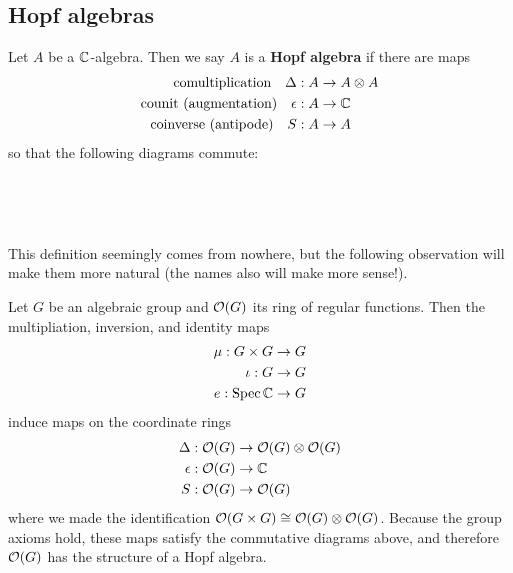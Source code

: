 \documentclass[12pt]{article}
\begin{document}
\subsection{Hopf algebras}
\begin{definition}
    Let $A$ be a $\mathbb{C}$-algebra. Then we say $A$ is a \textbf{Hopf algebra} if there are maps \begin{align*}
        \text{comultiplication\quad}\Delta: A &\to A\otimes A \\
        \text{counit (augmentation)\quad}\epsilon: A &\to \mathbb{C} \\
        \text{coinverse (antipode)\quad}S: A &\to A
    \end{align*}
    so that the following diagrams commute:
    \begin{center}
         \\

         \\
        

    \end{center}
\end{definition}
This definition seemingly comes from nowhere, but the following observation will make them more natural
(the names also will make more sense!).

\hfill

Let $G$ be an algebraic group and $\mathcal{O}(G)$ its ring of regular functions. Then the multipliation,
inversion, and identity maps \begin{align*}
    \mu: G\times G &\to G \\
    \iota: G &\to G \\
    e: \operatorname{Spec} \mathbb{C} &\to G
\end{align*}
induce maps on the coordinate rings
\begin{align*}
    \Delta: \mathcal{O}(G) &\to \mathcal{O}(G)\otimes \mathcal{O}(G) \\
    \epsilon: \mathcal{O}(G) &\to \mathbb{C} \\
    S: \mathcal{O}(G) &\to \mathcal{O}(G)
\end{align*} where we made the identification $\mathcal{O}(G\times G) \cong \mathcal{O}(G)\otimes \mathcal{O}(G)$.
Because the group axioms hold, these maps satisfy the commutative diagrams above, and therefore
$\mathcal{O}(G)$ has the structure of a Hopf algebra.
\end{document}
